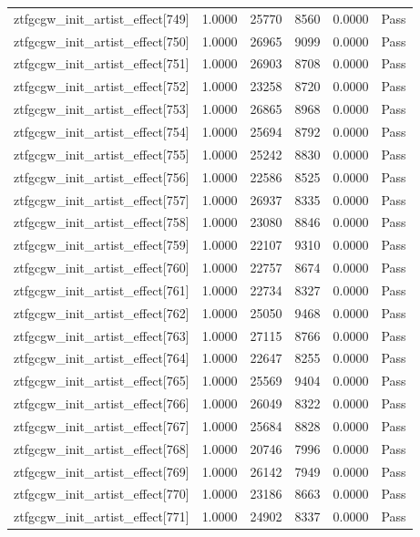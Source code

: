 \begin{table}[htbp]
\begin{tabular}{llrrll}
ztfgcgw\_init\_artist\_effect[749] & 1.0000 & 25770 & 8560 & 0.0000 & Pass \\
ztfgcgw\_init\_artist\_effect[750] & 1.0000 & 26965 & 9099 & 0.0000 & Pass \\
ztfgcgw\_init\_artist\_effect[751] & 1.0000 & 26903 & 8708 & 0.0000 & Pass \\
ztfgcgw\_init\_artist\_effect[752] & 1.0000 & 23258 & 8720 & 0.0000 & Pass \\
ztfgcgw\_init\_artist\_effect[753] & 1.0000 & 26865 & 8968 & 0.0000 & Pass \\
ztfgcgw\_init\_artist\_effect[754] & 1.0000 & 25694 & 8792 & 0.0000 & Pass \\
ztfgcgw\_init\_artist\_effect[755] & 1.0000 & 25242 & 8830 & 0.0000 & Pass \\
ztfgcgw\_init\_artist\_effect[756] & 1.0000 & 22586 & 8525 & 0.0000 & Pass \\
ztfgcgw\_init\_artist\_effect[757] & 1.0000 & 26937 & 8335 & 0.0000 & Pass \\
ztfgcgw\_init\_artist\_effect[758] & 1.0000 & 23080 & 8846 & 0.0000 & Pass \\
ztfgcgw\_init\_artist\_effect[759] & 1.0000 & 22107 & 9310 & 0.0000 & Pass \\
ztfgcgw\_init\_artist\_effect[760] & 1.0000 & 22757 & 8674 & 0.0000 & Pass \\
ztfgcgw\_init\_artist\_effect[761] & 1.0000 & 22734 & 8327 & 0.0000 & Pass \\
ztfgcgw\_init\_artist\_effect[762] & 1.0000 & 25050 & 9468 & 0.0000 & Pass \\
ztfgcgw\_init\_artist\_effect[763] & 1.0000 & 27115 & 8766 & 0.0000 & Pass \\
ztfgcgw\_init\_artist\_effect[764] & 1.0000 & 22647 & 8255 & 0.0000 & Pass \\
ztfgcgw\_init\_artist\_effect[765] & 1.0000 & 25569 & 9404 & 0.0000 & Pass \\
ztfgcgw\_init\_artist\_effect[766] & 1.0000 & 26049 & 8322 & 0.0000 & Pass \\
ztfgcgw\_init\_artist\_effect[767] & 1.0000 & 25684 & 8828 & 0.0000 & Pass \\
ztfgcgw\_init\_artist\_effect[768] & 1.0000 & 20746 & 7996 & 0.0000 & Pass \\
ztfgcgw\_init\_artist\_effect[769] & 1.0000 & 26142 & 7949 & 0.0000 & Pass \\
ztfgcgw\_init\_artist\_effect[770] & 1.0000 & 23186 & 8663 & 0.0000 & Pass \\
ztfgcgw\_init\_artist\_effect[771] & 1.0000 & 24902 & 8337 & 0.0000 & Pass \\

\end{tabular}
\end{table}
